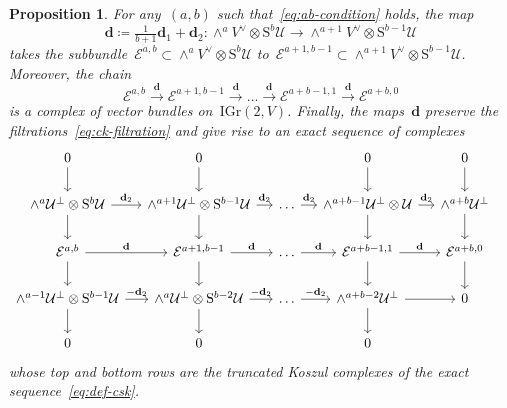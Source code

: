 \documentclass[a4paper]{article}
\newcommand{\IGr}{\mathrm{IGr}}
\newcommand{\cE}{\mathcal{E}}
\newcommand{\cU}{\mathcal{U}}
\newcommand{\Sy}{\mathrm{S}}
\newcommand{\vn}{\mathbf{d}}
\newtheorem{proposition}[theorem]{Proposition}
\theoremstyle{remark}
\theoremstyle{definition}
\begin{document}
\begin{proposition}
\label{prop:ck-complex}
For any~\((a,b)\) such that~\eqref{eq:ab-condition} holds,
the map
\begin{equation*}
\vn \coloneqq \tfrac1{b + 1}\vn_1 + \vn_2 \colon \wedge^aV^\vee \otimes \Sy^b\cU \to \wedge^{a+1}V^\vee \otimes \Sy^{b-1}\cU
\end{equation*}
takes the subbundle~\(\cE^{a,b} \subset \wedge^aV^\vee \otimes \Sy^b\cU\) to~\(\cE^{a+1,b-1} \subset \wedge^{a+1}V^\vee \otimes \Sy^{b-1}\cU\).
Moreover, the chain 
\begin{equation}
\label{eq:ck-complex}
\cE^{a,b} \xrightarrow{\ \vn\ }
\cE^{a+1,b-1} \xrightarrow{\ \vn\ }
\dots \xrightarrow{\ \vn\ }
\cE^{a+b-1,1} \xrightarrow{\ \vn\ }
\cE^{a+b,0}
\end{equation}
is a complex of vector bundles on~\(\IGr(2,V)\).
Finally, the maps~\(\vn\) preserve the filtrations~\eqref{eq:ck-filtration}
and give rise to 
an exact sequence of complexes
\[\begin{tikzcd}[column sep=small]
	0 \ar[d] & 0 \ar[d] && 0 \ar[d] & 0 \ar[d] &
	\\
	\wedge^a \cU^\perp \otimes \Sy^b \cU \ar[r, "{\vn_2}"] \ar[d] &
	\wedge^{a+1} \cU^\perp \otimes \Sy^{b-1} \cU \ar[r,"{\vn_2}"] \ar[d] &
	\dots \ar[r,"{\vn_2}"] &
	\wedge^{a+b-1} \cU^\perp \otimes \cU \ar[r, "{\vn_2}"] \ar[d] &
	\wedge^{a+b} \cU^\perp \ar[d] 
	\\
	\cE^{a,b} \ar[r, "\vn"] \ar[d] &
	\cE^{a+1,b-1} \ar[r,"\vn"] \ar[d] &
	\dots \ar[r,"\vn"] &
	\cE^{a+b-1,1} \ar[r,"\vn"] \ar[d] &
	\cE^{a+b,0} \ar[d] 
	\\
	\wedge^{a-1} \cU^\perp \otimes \Sy^{b-1} \cU \ar[r,"{-\vn_2}"] \ar[d] &
	\wedge^{a} \cU^\perp \otimes \Sy^{b-2} \cU \ar[r, "{-\vn_2}"] \ar[d] &
	\dots \ar[r,"{-\vn_2}"] &
	\wedge^{a+b-2} \cU^\perp \ar[r] \ar[d] &
	0
	\\
	0 & 0 && 0
\end{tikzcd}\]
whose top and bottom rows are the truncated Koszul complexes of the exact sequence~\eqref{eq:def-csk}.
\end{proposition}
\end{document}
